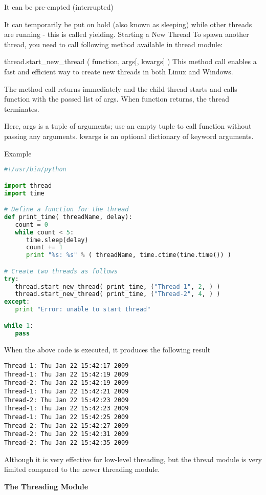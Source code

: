 It can be pre-empted (interrupted)

It can temporarily be put on hold (also known as sleeping) while other threads are running - this is called yielding.
Starting a New Thread
To spawn another thread, you need to call following method available in thread module:

thread.start_new_thread ( function, args[, kwargs] )
This method call enables a fast and efficient way to create new threads in both Linux and Windows.

The method call returns immediately and the child thread starts and calls function with the passed list of args. When function returns, the thread terminates.

Here, args is a tuple of arguments; use an empty tuple to call function without passing any arguments. kwargs is an optional dictionary of keyword arguments.

Example

\begin{lstlisting}[language=Python]
#!/usr/bin/python

import thread
import time

# Define a function for the thread
def print_time( threadName, delay):
   count = 0
   while count < 5:
      time.sleep(delay)
      count += 1
      print "%s: %s" % ( threadName, time.ctime(time.time()) )

# Create two threads as follows
try:
   thread.start_new_thread( print_time, ("Thread-1", 2, ) )
   thread.start_new_thread( print_time, ("Thread-2", 4, ) )
except:
   print "Error: unable to start thread"

while 1:
   pass
\end{lstlisting}

When the above code is executed, it produces the following result

\begin{lstlisting}
Thread-1: Thu Jan 22 15:42:17 2009
Thread-1: Thu Jan 22 15:42:19 2009
Thread-2: Thu Jan 22 15:42:19 2009
Thread-1: Thu Jan 22 15:42:21 2009
Thread-2: Thu Jan 22 15:42:23 2009
Thread-1: Thu Jan 22 15:42:23 2009
Thread-1: Thu Jan 22 15:42:25 2009
Thread-2: Thu Jan 22 15:42:27 2009
Thread-2: Thu Jan 22 15:42:31 2009
Thread-2: Thu Jan 22 15:42:35 2009
\end{lstlisting}

Although it is very effective for low-level threading, but the thread module is very limited compared to the newer threading module.

\textbf{The Threading Module}

